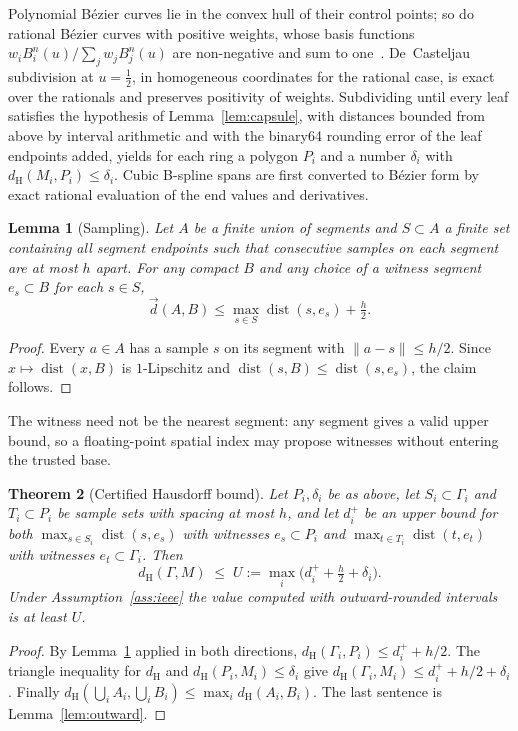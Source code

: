 \documentclass[11pt,a4paper]{article}
\newtheorem{theorem}{Theorem}
\newtheorem{lemma}[theorem]{Lemma}
\theoremstyle{definition}
\theoremstyle{remark}
\newcommand{\dH}{d_{\mathrm{H}}}
\newcommand{\dist}{\operatorname{dist}}
\begin{document}
Polynomial B\'ezier curves lie in the convex hull of their control points; so
do rational B\'ezier curves with positive weights, whose basis functions
$w_iB_i^n(u)/\sum_jw_jB_j^n(u)$ are non-negative and sum to
one~\cite{farin2002,piegl1997}. De~Casteljau subdivision at $u=\tfrac12$, in
homogeneous coordinates for the rational case, is exact over the rationals and
preserves positivity of weights. Subdividing until every leaf satisfies the
hypothesis of Lemma~\ref{lem:capsule}, with distances bounded from above by
interval arithmetic and with the binary64 rounding error of the leaf endpoints
added, yields for each ring a polygon $P_i$ and a number $\delta_i$ with
$\dH(M_i,P_i)\le\delta_i$. Cubic B-spline spans are first converted to
B\'ezier form by exact rational evaluation of the end values and derivatives.

\begin{lemma}[Sampling]\label{lem:sampling}
Let $A$ be a finite union of segments and $S\subset A$ a finite set containing
all segment endpoints such that consecutive samples on each segment are at
most $h$ apart. For any compact $B$ and any choice of a \emph{witness} segment
$e_s\subset B$ for each $s\in S$,
\[
  \vec d(A,B)\le\max_{s\in S}\dist(s,e_s)+\tfrac h2 .
\]
\end{lemma}
\begin{proof}
Every $a\in A$ has a sample $s$ on its segment with $\lVert a-s\rVert\le h/2$.
Since $x\mapsto\dist(x,B)$ is $1$-Lipschitz and
$\dist(s,B)\le\dist(s,e_s)$, the claim follows.
\end{proof}

The witness need not be the nearest segment: any segment gives a valid upper
bound, so a floating-point spatial index may propose witnesses without entering
the trusted base.

\begin{theorem}[Certified Hausdorff bound]\label{thm:hausdorff}
Let $P_i,\delta_i$ be as above, let $S_i\subset\Gamma_i$ and $T_i\subset P_i$
be sample sets with spacing at most $h$, and let $d_i^{+}$ be an upper bound
for both $\max_{s\in S_i}\dist(s,e_s)$ with witnesses $e_s\subset P_i$ and
$\max_{t\in T_i}\dist(t,e_t)$ with witnesses $e_t\subset\Gamma_i$. Then
\[
  \dH(\Gamma,M)\;\le\;U:=\max_i\bigl(d_i^{+}+\tfrac h2+\delta_i\bigr).
\]
Under Assumption~\ref{ass:ieee} the value computed with outward-rounded
intervals is at least $U$.
\end{theorem}
\begin{proof}
By Lemma~\ref{lem:sampling} applied in both directions,
$\dH(\Gamma_i,P_i)\le d_i^{+}+h/2$. The triangle inequality for $\dH$ and
$\dH(P_i,M_i)\le\delta_i$ give $\dH(\Gamma_i,M_i)\le d_i^{+}+h/2+\delta_i$.
Finally $\dH(\bigcup_iA_i,\bigcup_iB_i)\le\max_i\dH(A_i,B_i)$. The last
sentence is Lemma~\ref{lem:outward}.
\end{proof}
\end{document}
